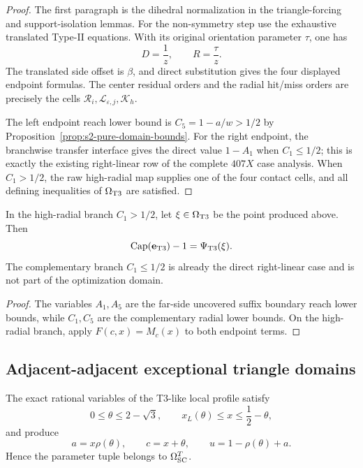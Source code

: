\begin{proof}
The first paragraph is the dihedral normalization in the triangle-forcing and
support-isolation lemmas.  For the non-symmetry step use the exhaustive
translated Type-II equations.  With its original orientation parameter
\(\tau\), one has
\[
 D=\frac1z,\qquad R=\frac{\tau}{z}.
\]
The translated side offset is \(\beta\), and direct substitution gives the
four displayed endpoint formulas.  The center residual orders and the radial
hit/miss orders are precisely the cells
\(\mathcal R_i,\mathcal L_{\varepsilon,j},\mathcal K_h\).

The left endpoint reach lower bound is $C_5=1-a/w>1/2$ by
Proposition~\ref{prop:s2-pure-domain-bounds}.  For the right endpoint, the
branchwise transfer interface gives the direct value $1-A_1$ when
$C_1\le1/2$; this is exactly the existing right-linear row of the complete
$407X$ case analysis.  When $C_1>1/2$, the raw high-radial map supplies one of the
four contact cells, and all defining inequalities of
$\Omega_{\rm T3}$ are satisfied.
\end{proof}

\begin{proposition}
\label{prop:s2-t3-objective-bridge}
In the high-radial branch $C_1>1/2$, let
$\xi\in\Omega_{\rm T3}$ be the point produced above.  Then
\[
 \mathrm{Cap}(\mathbf e_{\rm T3})-1
 =\Psi_{\rm T3}(\xi).
\]
The complementary branch $C_1\le1/2$ is already the direct right-linear case
and is not part of the optimization domain.
\end{proposition}

\begin{proof}
The variables \(A_1,A_5\) are the far-side uncovered suffix boundary reach lower bounds, while
\(C_1,C_5\) are the complementary radial lower bounds.  On the high-radial branch,
apply \(F(c,x)=M_c(x)\) to both endpoint terms.
\end{proof}

\subsection{Adjacent-adjacent exceptional triangle domains}

\begin{proposition}
\label{prop:s2-sc-t3-bridge}
The exact rational variables of the T3-like local profile satisfy
\[
 0\le\theta\le2-\sqrt3,\qquad
 x_L(\theta)\le x\le\frac12-\theta,
\]
and produce
\[
 a=x\rho(\theta),\qquad
 c=x+\theta,\qquad
 u=1-\rho(\theta)+a.
\]
Hence the parameter tuple belongs to \(\Omega_{\rm SC}^{T}\).
\end{proposition}

